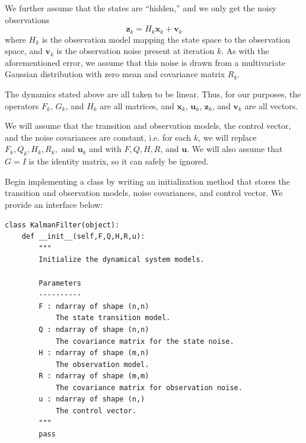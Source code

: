 We further assume that the states are ``hidden,'' and we only get the noisy observations
\begin{equation}
\mathbf{z}_{k} = H_{k}\mathbf{x}_{k} + \mathbf{v}_{k}
\label{eq:obs}
\end{equation}
where $H_{k}$ is the observation model mapping the state space to the observation space, and $\mathbf{v}_{k}$ is the observation noise present at iteration $k$.
As with the aforementioned error, we assume that this noise is drawn from a multivariate Gaussian distribution with zero mean and covariance matrix $R_{k}$.

The dynamics stated above are all taken to be linear.
Thus, for our purposes, the operators $F_k$, $G_k$, and $H_k$ are all matrices, and $\mathbf{x}_k$, $\mathbf{u}_k$, $\mathbf{z}_k$, and $\mathbf{v}_k$ are all vectors.

We will assume that the transition and observation models, the control vector, and the noise covariances are constant, i.e. for each $k$, we will replace $F_{k}, Q_{k}, H_k, R_{k},$ and $\mathbf{u}_{k}$ and with $F, Q, H, R$, and $\mathbf{u}$.
We will also assume that $G = I$ is the identity matrix, so it can safely be ignored.

\begin{problem}
Begin implementing a  class by writing an initialization method that stores the transition and observation models, noise covariances, and control vector.
We provide an interface below:
\begin{lstlisting}
class KalmanFilter(object):
    def __init__(self,F,Q,H,R,u):
        """
        Initialize the dynamical system models.

        Parameters
        ----------
        F : ndarray of shape (n,n)
            The state transition model.
        Q : ndarray of shape (n,n)
            The covariance matrix for the state noise.
        H : ndarray of shape (m,n)
            The observation model.
        R : ndarray of shape (m,m)
            The covariance matrix for observation noise.
        u : ndarray of shape (n,)
            The control vector.
        """
        pass
\end{lstlisting}
\end{problem}

